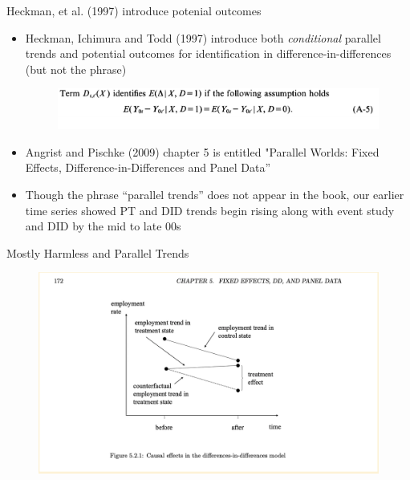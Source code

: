 \documentclass{beamer}
\begin{document}
\begin{frame}{Heckman, et al. (1997) introduce potenial outcomes}


\begin{itemize}
\item Heckman, Ichimura and Todd (1997) introduce both \emph{conditional} parallel trends and potential outcomes for identification in difference-in-differences (but not the phrase)

\bigskip

	\begin{figure}
	\includegraphics[scale=0.2]{./lecture_includes/heckman_cpt}
	\end{figure}


\item Angrist and Pischke (2009) chapter 5 is entitled "Parallel Worlds: Fixed Effects, Difference-in-Differences and Panel Data''
\item Though the phrase ``parallel trends'' does not appear in the book, our earlier time series showed PT and DID trends begin rising along with event study and DID by the mid to late 00s
\end{itemize}


\end{frame}




\begin{frame}{Mostly Harmless and Parallel Trends}


	\begin{figure}
	\includegraphics[scale=0.45]{./lecture_includes/mhe_pt}
	\end{figure}



\end{frame}
\end{document}
